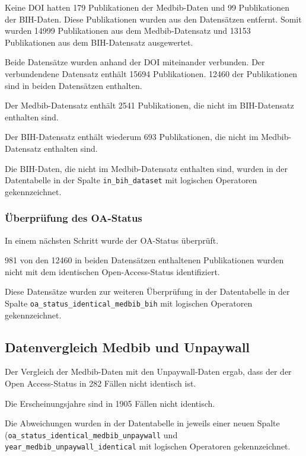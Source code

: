 \documentclass[
]{article}
\begin{document}
Keine DOI hatten 179 Publikationen der Medbib-Daten und 99 Publikationen
der BIH-Daten. Diese Publikationen wurden aus den Datensätzen entfernt.
Somit wurden 14999 Publikationen aus dem Medbib-Datensatz und 13153
Publikationen aus dem BIH-Datensatz ausgewertet.

Beide Datensätze wurden anhand der DOI miteinander verbunden. Der
verbundendene Datensatz enthält 15694 Publikationen. 12460 der
Publikationen sind in beiden Datensätzen enthalten.

Der Medbib-Datensatz enthält 2541 Publikationen, die nicht im
BIH-Datensatz enthalten sind.

Der BIH-Datensatz enthält wiederum 693 Publikationen, die nicht im
Medbib-Datensatz enthalten sind.

Die BIH-Daten, die nicht im Medbib-Datensatz enthalten sind, wurden in
der Datentabelle in der Spalte \texttt{in\_bih\_dataset} mit logischen
Operatoren gekennzeichnet.

\hypertarget{uxfcberpruxfcfung-des-oa-status}{%
\subsubsection{Überprüfung des
OA-Status}\label{uxfcberpruxfcfung-des-oa-status}}

In einem nächsten Schritt wurde der OA-Status überprüft.

981 von den 12460 in beiden Datensätzen enthaltenen Publikationen wurden
nicht mit dem identischen Open-Access-Status identifiziert.

Diese Datensätze wurden zur weiteren Überprüfung in der Datentabelle in
der Spalte \texttt{oa\_status\_identical\_medbib\_bih} mit logischen
Operatoren gekennzeichnet.

\hypertarget{datenvergleich-medbib-und-unpaywall}{%
\subsection{Datenvergleich Medbib und
Unpaywall}\label{datenvergleich-medbib-und-unpaywall}}

Der Vergleich der Medbib-Daten mit den Unpaywall-Daten ergab, dass der
der Open Access-Status in 282 Fällen nicht identisch ist.

Die Erscheinungsjahre sind in 1905 Fällen nicht identisch.

Die Abweichungen wurden in der Datentabelle in jeweils einer neuen
Spalte (\texttt{oa\_status\_identical\_medbib\_unpaywall} und
\texttt{year\_medbib\_unpaywall\_identical} mit logischen Operatoren
gekennzeichnet.
\end{document}
